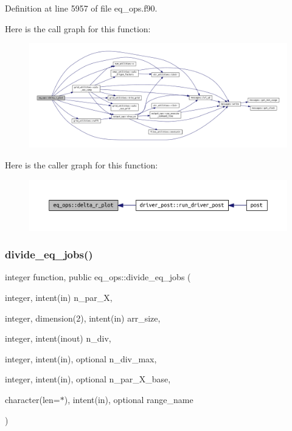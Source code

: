 Definition at line 5957 of file eq\+\_\+ops.\+f90.

Here is the call graph for this function\+:
\nopagebreak
\begin{figure}[H]
\begin{center}
\leavevmode
\includegraphics[width=350pt]{namespaceeq__ops_ac0a79893900631d25b170be0abd2c131_cgraph}
\end{center}
\end{figure}
Here is the caller graph for this function\+:
\nopagebreak
\begin{figure}[H]
\begin{center}
\leavevmode
\includegraphics[width=350pt]{namespaceeq__ops_ac0a79893900631d25b170be0abd2c131_icgraph}
\end{center}
\end{figure}
\mbox{\label{namespaceeq__ops_a8fae749abe55865d8135fef536a8e8f1}} 
\subsubsection{\texorpdfstring{divide\+\_\+eq\+\_\+jobs()}{divide\_eq\_jobs()}}
{\footnotesize\ttfamily integer function, public eq\+\_\+ops\+::divide\+\_\+eq\+\_\+jobs (\begin{DoxyParamCaption}\item[{integer, intent(in)}]{n\+\_\+par\+\_\+X,  }\item[{integer, dimension(2), intent(in)}]{arr\+\_\+size,  }\item[{integer, intent(inout)}]{n\+\_\+div,  }\item[{integer, intent(in), optional}]{n\+\_\+div\+\_\+max,  }\item[{integer, intent(in), optional}]{n\+\_\+par\+\_\+\+X\+\_\+base,  }\item[{character(len=$\ast$), intent(in), optional}]{range\+\_\+name }\end{DoxyParamCaption})}



